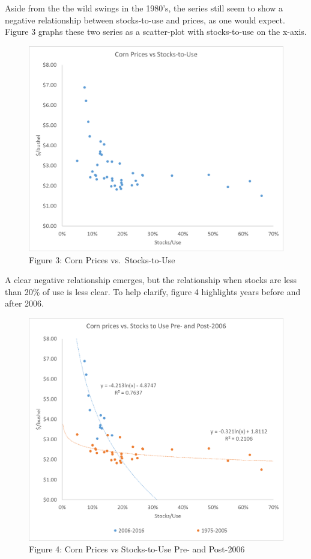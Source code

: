 \documentclass[]{book}
\theoremstyle{definition}
\theoremstyle{definition}
\theoremstyle{remark}
\begin{document}
Aside from the the wild swings in the 1980's, the series still seem to
show a negative relationship between stocks-to-use and prices, as one
would expect. Figure 3 graphs these two series as a scatter-plot with
stocks-to-use on the x-axis.

\begin{figure}[htbp]
\centering
\includegraphics{Excel-files/EndingStocksand-corn_endingstock_prices_files/image001.png}
\caption{Figure 3: Corn Prices vs.~Stocks-to-Use}
\end{figure}

A clear negative relationship emerges, but the relationship when stocks
are less than 20\% of use is less clear. To help clarify, figure 4
highlights years before and after 2006.

\begin{figure}[htbp]
\centering
\includegraphics{Excel-files/EndingStocksand-corn_endingstock_prices_files/image002.png}
\caption{Figure 4: Corn Prices vs Stocks-to-Use Pre- and Post-2006}
\end{figure}
\end{document}
